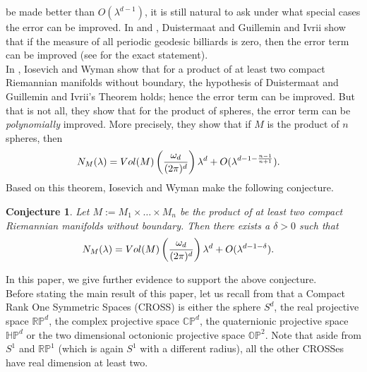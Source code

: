 \documentclass[11pt,lettersize,reqno,fullpage]{amsart}
\providecommand \hf{\hspace*{0.5cm}}
\newtheorem{conj}[thm]{Conjecture}
\begin{document}
be made better than $O(\lambda^{d-1})$, it is still 
natural to ask under what special cases the error can be improved. In \cite{Dust} and \cite{Ivrii}, Duistermaat and Guillemin 
and Ivrii show that if the measure of all periodic geodesic billiards is zero, then the error term can be improved 
(see \cite[page 595, theorem 1.3]{Weyl_Wyman_Iosevich} for the exact statement). \\ 
\hf \hf In \cite{Weyl_Wyman_Iosevich}, Iosevich and Wyman show 
\cite[page 596, theorem 1.4]{Weyl_Wyman_Iosevich}
that for a product of 
at least two compact 
Riemannian manifolds without boundary, the 
hypothesis of 
Duistermaat and Guillemin 
and Ivrii's Theorem holds; hence the error term can be improved. But that is not all, they show that 
for the product of spheres, the 
error term 
can be \textit{polynomially} improved. More precisely, they show \cite[page 596, theorem 1.4]{Weyl_Wyman_Iosevich} 
that if $M$ is the product of $n$ spheres, then 
\begin{align}
N_M(\lambda) & = \textnormal{Vol}(M)\left(\frac{\omega_d}{(2\pi)^d}\right)  \lambda^d + O(\lambda^{d-1-\frac{n-1}{n+1}}).
\end{align}
Based on this theorem, Iosevich and Wyman make the following conjecture. 
\begin{conj}\label{Conj_IW} 
\cite[page 597]{Weyl_Wyman_Iosevich} 
Let $M:= M_1 \times \ldots \times M_n$ be the product of 
at least two compact Riemannian manifolds without boundary. Then there exists a $\delta>0$ 
such that  
\begin{align}
N_M(\lambda) & = \textnormal{Vol}(M)\left(\frac{\omega_d}{(2\pi)^d}\right)  \lambda^d + O(\lambda^{d-1-\delta}).
\end{align}
\end{conj}
In this paper, we give further evidence to support the above conjecture. \\ 
\hf \hf Before stating the main result of this paper, let us 
recall from \cite[page 76]{AB} 
that a Compact Rank One Symmetric Spaces (CROSS) 
is either the sphere $S^d$, the 
real projective space $\mathbb{RP}^d$, 
the complex projective space $\mathbb{CP}^d$, the quaternionic projective space $\mathbb{HP}^d$ 
or the two dimensional octonionic projective space $\mathbb{OP}^2$. 
Note that aside from $S^1$ and $\mathbb{RP}^1$ (which is again $S^1$ with a  different radius), all the other CROSSes 
have real dimension at least two. 
\end{document}
